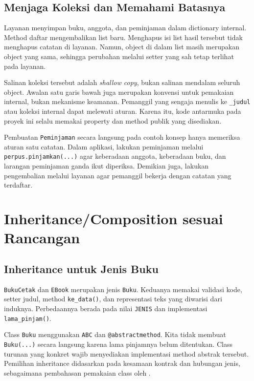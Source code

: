 \subsection{Menjaga Koleksi dan Memahami Batasnya}

Layanan menyimpan buku, anggota, dan peminjaman dalam dictionary internal. Method daftar mengembalikan list baru. Menghapus isi list hasil tersebut tidak menghapus catatan di layanan. Namun, object di dalam list masih merupakan object yang sama, sehingga perubahan melalui setter yang sah tetap terlihat pada layanan.

Salinan koleksi tersebut adalah \emph{shallow copy}, bukan salinan mendalam seluruh object. Awalan satu garis bawah juga merupakan konvensi untuk pemakaian internal, bukan mekanisme keamanan. Pemanggil yang sengaja menulis ke \texttt{\_judul} atau koleksi internal dapat melewati aturan. Karena itu, kode antarmuka pada proyek ini selalu memakai property dan method publik yang disediakan.

\begin{penting}
Pembuatan \texttt{Peminjaman} secara langsung pada contoh konsep hanya memeriksa aturan satu catatan. Dalam aplikasi, lakukan peminjaman melalui \texttt{perpus.pinjamkan(...)} agar keberadaan anggota, keberadaan buku, dan larangan peminjaman ganda ikut diperiksa. Demikian juga, lakukan pengembalian melalui layanan agar pemanggil bekerja dengan catatan yang terdaftar.
\end{penting}

\section{Inheritance/Composition sesuai Rancangan}

\subsection{Inheritance untuk Jenis Buku}

\texttt{BukuCetak} dan \texttt{EBook} merupakan jenis \texttt{Buku}. Keduanya memakai validasi kode, setter judul, method \texttt{ke\_data()}, dan representasi teks yang diwarisi dari induknya. Perbedaannya berada pada nilai \texttt{JENIS} dan implementasi \texttt{lama\_pinjam()}.

Class \texttt{Buku} menggunakan \texttt{ABC} dan \texttt{@abstractmethod}. Kita tidak membuat \texttt{Buku(...)} secara langsung karena lama pinjamnya belum ditentukan. Class turunan yang konkret wajib menyediakan implementasi method abstrak tersebut. Pemilihan inheritance didasarkan pada kesamaan kontrak dan hubungan jenis, sebagaimana pembahasan pemakaian class oleh \cite{lutz2025learning}.

